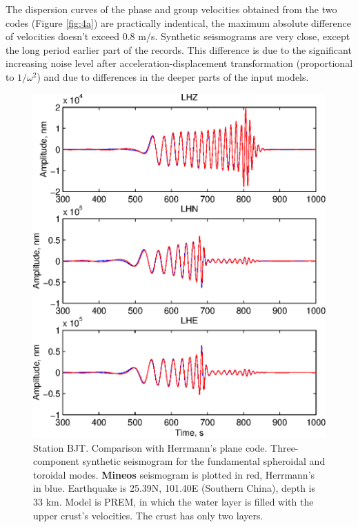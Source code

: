 \noindent The dispersion curves of the phase and group velocities obtained 
from the two codes (Figure \ref{fig:4a}) are practically indentical, the maximum
absolute difference of velocities doesn't exceed 0.8 m/s.
Synthetic seismograms are very close, except the long period earlier part
of the records. This difference is due to the significant increasing noise level
after acceleration-displacement transformation (proportional to $1/\omega^2$) and
due to differences in the deeper parts of the input models.
\begin{figure}
\begin{center}
\includegraphics[width=5 in]{Figures/Fig1a}
\caption{Station BJT. Comparison with Herrmann's plane code. 
Three-component synthetic seismogram for the fundamental spheroidal and toroidal modes. 
{\bf Mineos} seismogram is plotted in red, Herrmann's in blue. Earthquake is 
25.39N, 101.40E (Southern China), depth is 33 km. Model is 
PREM, in which the water layer is filled with the upper crust's velocities.
The crust has only two layers.
}
\label{fig:1a}
\end{center}
\end{figure}
